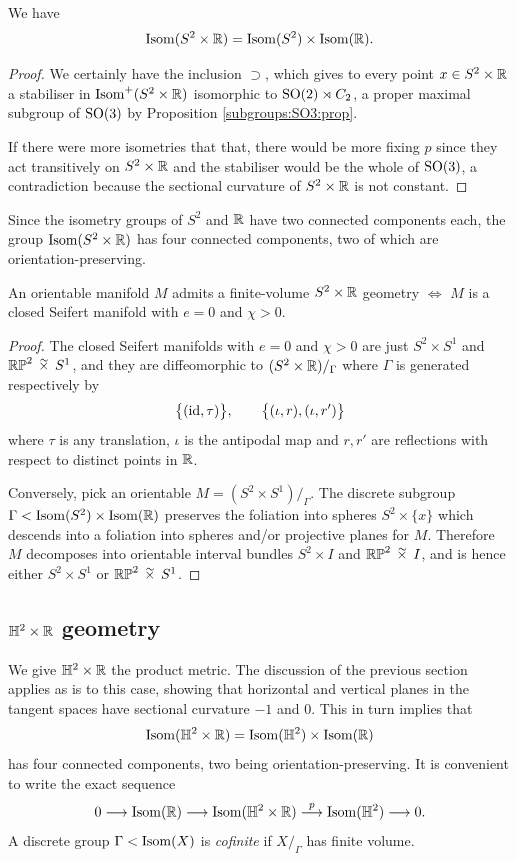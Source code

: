 \begin{prop}
We have
$${\rm Isom}(S^2\times \mathbb{R}) = {\rm Isom}(S^2) \times {\rm Isom}(\mathbb{R}).$$
\end{prop}
\begin{proof}
We certainly have the inclusion $\supset$, which gives to every point $x\in S^2\times \mathbb{R}$ a stabiliser in ${\rm Isom}^+(S^2\times \mathbb{R})$ isomorphic to ${\rm SO}(2) \rtimes C_2$, a proper maximal subgroup of ${\rm SO}(3)$ by Proposition \ref{subgroups:SO3:prop}. 

If there were more isometries that that, there would be more fixing $p$ since they act transitively on $S^2\times \mathbb{R}$ and the stabiliser would be the whole of ${\rm SO}(3)$, a contradiction because the sectional curvature of $S^2\times \mathbb{R}$ is not constant.
\end{proof}
Since the isometry groups of $S^2$ and $\mathbb{R}$ have two connected components each, the group ${\rm Isom}(S^2\times \mathbb{R})$ has four connected components, two of which are orientation-preserving.

\begin{prop}
An orientable manifold $M$ admits a finite-volume $S^2\times \mathbb{R}$ geometry $\Longleftrightarrow$ $M$ is a closed Seifert manifold with $e= 0$ and $\chi>0$. 
\end{prop}
\begin{proof}
The closed Seifert manifolds with $e=0$ and $\chi>0$ are
just $S^2\times S^1$ and $\matRP^2 \timtil S^1$, and they are diffeomorphic to $(S^2\times \mathbb{R})/_{\Gamma}$ where $\Gamma$ is generated respectively by 
$$\big\{({\rm id}, \tau)\big\}, \qquad \big\{(\iota, r), (\iota, r')\big\}$$
where $\tau$ is any translation, $\iota$ is the antipodal map and $r,r'$ are reflections with respect to distinct points in $\mathbb{R}$.

Conversely, pick an orientable $M = (S^2\times S^1)/_\Gamma$. The discrete subgroup $\Gamma < {\rm Isom}(S^2) \times {\rm Isom}(\mathbb{R})$ preserves the foliation into spheres $S^2\times \{x\}$ which descends into a foliation into spheres and/or projective planes for $M$. Therefore $M$ decomposes into orientable interval bundles $S^2\times I$ and $\matRP^2\timtil I$, and is hence either $S^2\times S^1$ or $\matRP^2 \timtil S^1$.
\end{proof}

\subsection{$\mathbb{H}^2 \times \mathbb{R}$ geometry}
We give $\mathbb{H}^2 \times \mathbb{R}$ the product metric. The discussion of the previous section applies as is to this case, showing that horizontal and vertical planes in the tangent spaces have sectional curvature $-1$ and $0$. This in turn implies that
$${\rm Isom}(\mathbb{H}^2\times \mathbb{R}) = {\rm Isom}(\mathbb{H}^2) \times {\rm Isom}(\mathbb{R})$$
has four connected components, two being orientation-preserving. It is convenient to write the exact sequence
$$0 \longrightarrow {\rm Isom}(\mathbb{R}) \longrightarrow {\rm Isom}(\mathbb{H}^2\times \mathbb{R}) \stackrel p \longrightarrow {\rm Isom}(\mathbb{H}^2) \longrightarrow 0.$$
A discrete group $\Gamma<{\rm Isom}(X)$ is \emph{cofinite} if $X/_\Gamma$ has finite volume.

